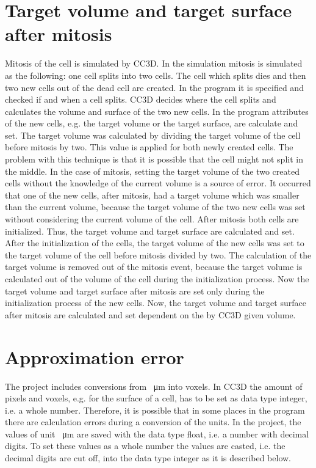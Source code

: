 \section{Target volume and target surface after mitosis} \label{sec:TargetVolumeSurfaceAfterMitosis}
Mitosis of the cell is simulated by \ac{CC3D}. In the simulation mitosis is simulated as the following: one cell splits into two cells. The cell which splits dies and then two new cells out of the dead cell are created. \newline
In the program it is specified and checked if and when a cell splits. \ac{CC3D} decides where the cell splits and calculates the volume and surface of the two new cells. In the program attributes of the new cells, e.g. the target volume or the target surface, are calculate and set. \newline 
The target volume was calculated by dividing the target volume of the cell before mitosis by two. This value is applied for both newly created cells. The problem with this technique is that it is possible that the cell might not split in the middle. In the case of mitosis, setting the target volume of the two created cells without the knowledge of the current volume is a source of error. It occurred that one of the new cells, after mitosis, had a target volume which was smaller than the current volume, because the target volume of the two new cells was set without considering the current volume of the cell. \newline
After mitosis both cells are initialized. Thus, the target volume and target surface are calculated and set. After the initialization of the cells, the target volume of the new cells was set to the target volume of the cell before mitosis divided by two. \newline
The calculation of the target volume is removed out of the mitosis event, because the target volume is calculated out of the volume of the cell during the initialization process.  Now the target volume and target surface after mitosis are set only during the initialization process of the new cells. \newline
Now, the target volume and target surface after mitosis are calculated and set dependent on the by \ac{CC3D} given volume.


\section{Approximation error} \label{sec:ApproximationError}
The project includes conversions from \SI{}{\micro\metre} into voxels. In \ac{CC3D} the amount of pixels and voxels, e.g. for the surface of a cell, has to be set as data type integer, i.e. a whole number. Therefore, it is possible that in some places in the program there are calculation errors during a conversion of the units. In the project, the values of unit \SI{}{\micro\metre} are saved with the data type float, i.e. a number with decimal digits. To set these values as a whole number the values are casted, i.e. the decimal digits are cut off, into the data type integer as it is described below. 

